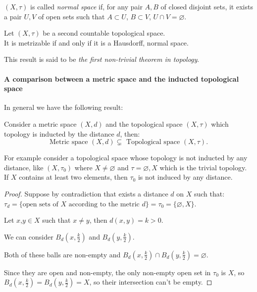 \begin{defn}
	$(X, \tau)$ is called \emph{normal space} if, for any pair $A, B$ of closed disjoint sets, it exists a pair $U, V$ of open sets such that $A \subset U$, $B \subset V$, $U \cap V = \varnothing$.
\end{defn}

\begin{theo}
	Let $(X, \tau)$ be a second countable topological space. \\
	It is metrizable if and only if it is a Hausdorff, normal space.
\end{theo}
This result is said to be \textit{the first non-trivial theorem in topology}.

\paragraph{A comparison between a metric space and the inducted topological space} In general we have the following result:
\begin{prop} \label{topological-larger-metric}
	Consider a metric space $(X,d)$ and the topological space $(X,\tau)$ which topology is inducted by the distance $d$, then:
	$$\text{Metric space }(X,d) \subsetneq \text{ Topological space }(X,\tau).$$
\end{prop}
For example consider a topological space whose topology is not inducted by any distance, like $(X, \tau_0)$ where $X \neq \varnothing$ and $\tau={\varnothing, X}$ which is the trivial topology. If $X$ contains at least two elements, then $\tau_0$ is not induced by any distance.
\begin{proof}
	Suppose by contradiction that exists a distance $d$ on $X$ such that: $\tau_d =\{\text{open sets of }X\text{ according to the metric }d\}=\tau_0=\{\varnothing, X\}$.
	
	Let $x$,$y \in X$ such that $x \neq y$, then $d(x,y)=k>0$.
	
	We can consider $B_d(x, \frac k 2)$ and $B_d(y, \frac k 2)$.
	
	Both of these balls are non-empty and $B_d(x, \frac k 2) \cap B_d(y, \frac k 2) = \varnothing$.
	
	Since they are open and non-empty, the only non-empty open set in $\tau_0$ is $X$, so $B_d(x, \frac k 2) = B_d(y, \frac k 2) = X$, so their intersection can't be empty.
\end{proof}

